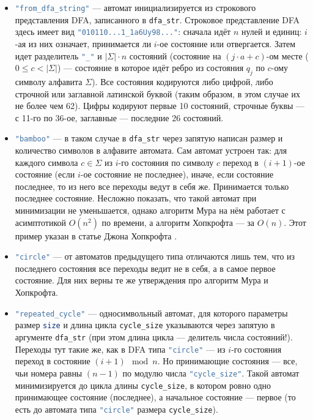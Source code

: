 \documentclass{article}
\begin{document}
 \begin{itemize}
  \item[\ding{82}] \lstinline[language=bash]!"from_dfa_string"! --- автомат инициализируется из строкового представления DFA, записанного в \lstinline[language=bash]!dfa_str!. Строковое представление DFA здесь имеет вид \lstinline[language=bash]!"010110...1_1a6Uy98..."!: сначала идёт $n$ нулей и единиц: $i$-ая из них означает, принимается ли $i$-ое состояние или отвергается. Затем идет разделитель \lstinline[language=bash]!"_"! и $|\Sigma| \cdot n$ состояний (состояние на $(j \cdot a + c)$-ом месте ($0 \le c < |\Sigma|$) --- состояние в которое идёт ребро из состояния $q_j$ по $c$-ому символу алфавита $\Sigma$). Все состояния кодируются либо цифрой, либо строчной или заглавной латинской буквой (таким образом, в этом случае их не более чем 62). Цифры кодируют первые 10 состояний, строчные буквы --- с 11-го по 36-ое, заглавные --- последние 26 состояний.
  \item[\ding{82}] \lstinline[language=bash]!"bamboo"! --- в таком случае в \lstinline[language=C++]!dfa_str! через запятую написан размер и количество символов в алфавите автомата. Сам автомат устроен так: для каждого символа $c\in \Sigma$ из $i$-го состояния по символу $c$ переход в $(i + 1)$-ое состояние (если $i$-ое состояние не последнее), иначе, если состояние последнее, то из него все переходы ведут в себя же. Принимается только последнее состояние. Несложно показать, что такой автомат при минимизации не уменьшается, однако алгоритм Мура на нём работает с асимптотикой $O(n^2)$ по времени, а алгоритм Хопкрофта --- за $O(n)$. Этот пример указан в статье Джона Хопкрофта \cite{hopcroft1971n}.
  \item[\ding{82}] \lstinline[language=bash]!"circle"! --- от автоматов предыдущего типа отличаются лишь тем, что из последнего состояния все переходы ведит не в себя, а в самое первое состояние. Для них верны те же утверждения про алгоритм Мура и Хопкрофта.
  \item[\ding{82}] \lstinline[language=bash]!"repeated_cycle"! --- односимвольный автомат, для которого параметры размер \lstinline[language=bash]!size! и длина цикла \lstinline[language=bash]!cycle_size! указываются через запятую в аргументе \lstinline[language=C++]!dfa_str! (при этом длина цикла --- делитель числа состояний!). Переходы тут такие же, как в DFA типа \lstinline[language=bash]!"circle"! --- из $i$-го состояния переход в состояние $(i + 1) \mod n$. Но принимающие состояния --- все, чьи номера равны $(n - 1)$ по модулю числа \lstinline[language=bash]!"cycle_size"!. Такой автомат минимизируется до цикла длины \lstinline[language=bash]!cycle_size!, в котором ровно одно принимающее состояние (последнее), а начальное состояние --- первое (то есть до автомата типа \lstinline[language=bash]!"circle"! размера \lstinline[language=bash]!cycle_size!).

\end{itemize}
\end{document}
